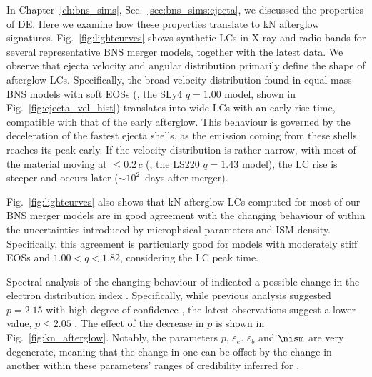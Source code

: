 In Chapter~\ref{ch:bns_sims}, Sec.~\ref{sec:bns_sims:ejecta}, we discussed the properties of \ac{DE}. Here we examine how these properties translate to \ac{kN} 
afterglow signatures. 
%
Fig.~\ref{fig:lightcurves} shows synthetic \acp{LC} in X-ray and radio bands 
for several representative \ac{BNS} merger models, together with the latest 
\GRB{} data. 
We observe that ejecta velocity and angular distribution primarily define the shape of 
afterglow \acp{LC}. 
Specifically, the broad velocity distribution found in equal mass \ac{BNS} models 
with soft \acp{EOS} (\eg, the SLy4 $q=1.00$ model, shown in Fig.~\ref{fig:ejecta_vel_hist}) 
translates into wide \acp{LC} with an early rise time, compatible with that of the early \GRB{} afterglow. 
This behaviour is governed by the deceleration of the fastest ejecta shells, 
as the emission coming from these shells reaches its peak early. 
If the velocity distribution is rather narrow, with most of the 
material moving at ${\leq}0.2\,c$ (\eg, the LS220 $q=1.43$ model), 
the \ac{LC} rise is steeper and occurs later (${\sim}10^2$~days after merger). 

Fig.~\ref{fig:lightcurves} also shows that \ac{kN} afterglow \acp{LC} computed 
for most of our \ac{BNS} merger models are in good agreement with the 
changing behaviour of \GRB{} within the uncertainties introduced by microphsical 
parameters and \ac{ISM} density.
%
Specifically, this agreement is particularly good for models with moderately stiff 
\acp{EOS} and $1.00<q<1.82$, considering the \ac{LC} peak time.

Spectral analysis of the changing behaviour of \GRB{} indicated a possible 
change in the electron distribution index \citep{Hajela:2021faz}. Specifically, 
while previous \GRB{} analysis suggested $p=2.15$ with high degree of confidence 
\citep[\eg][]{Hajela:2019mjy}, the latest observations suggest a lower value, 
$p\leq2.05$ \citep{Hajela:2021faz}. 
%
The effect of the decrease in $p$ is shown in 
Fig.~\ref{fig:kn_afterglow}. Notably, the parameters $p$, $\varepsilon_e$. $\varepsilon_b$ and 
$\nism$ are very degenerate, meaning that the change in one can be offset by the change in 
another within these parameters' ranges of credibility inferred for \GRB{}. 

